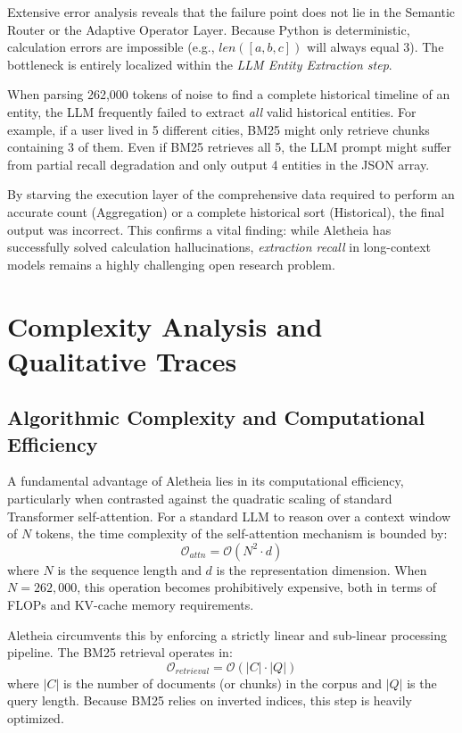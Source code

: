 \documentclass[journal,10pt]{IEEEtran}
\begin{document}
Extensive error analysis reveals that the failure point does not lie in the Semantic Router or the Adaptive Operator Layer. Because Python is deterministic, calculation errors are impossible (e.g., $len([a,b,c])$ will always equal 3). The bottleneck is entirely localized within the \textit{LLM Entity Extraction step}. 

When parsing 262,000 tokens of noise to find a complete historical timeline of an entity, the LLM frequently failed to extract \textit{all} valid historical entities. For example, if a user lived in 5 different cities, BM25 might only retrieve chunks containing 3 of them. Even if BM25 retrieves all 5, the LLM prompt might suffer from partial recall degradation and only output 4 entities in the JSON array. 

By starving the execution layer of the comprehensive data required to perform an accurate count (Aggregation) or a complete historical sort (Historical), the final output was incorrect. This confirms a vital finding: while Aletheia has successfully solved calculation hallucinations, \textit{extraction recall} in long-context models remains a highly challenging open research problem.


\section{Complexity Analysis and Qualitative Traces}

\subsection{Algorithmic Complexity and Computational Efficiency}
A fundamental advantage of Aletheia lies in its computational efficiency, particularly when contrasted against the quadratic scaling of standard Transformer self-attention. For a standard LLM to reason over a context window of $N$ tokens, the time complexity of the self-attention mechanism is bounded by:
\begin{equation}
\mathcal{O}_{attn} = \mathcal{O}(N^2 \cdot d)
\end{equation}
where $N$ is the sequence length and $d$ is the representation dimension. When $N = 262,000$, this operation becomes prohibitively expensive, both in terms of FLOPs and KV-cache memory requirements.

Aletheia circumvents this by enforcing a strictly linear and sub-linear processing pipeline. The BM25 retrieval operates in:
\begin{equation}
\mathcal{O}_{retrieval} = \mathcal{O}(|C| \cdot |Q|)
\end{equation}
where $|C|$ is the number of documents (or chunks) in the corpus and $|Q|$ is the query length. Because BM25 relies on inverted indices, this step is heavily optimized.
\end{document}
